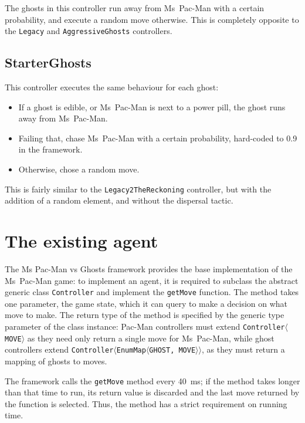 The ghosts in this controller run away from Ms~Pac-Man with a certain probability, and execute a random move otherwise.  This is completely opposite to the {\tt Legacy} and {\tt AggressiveGhosts} controllers.

\subsection{StarterGhosts}

This controller executes the same behaviour for each ghost:

\begin{itemize}
\item If a ghost is edible, or Ms~Pac-Man is next to a power pill, the ghost runs away from Ms~Pac-Man.
\item Failing that, chase Ms~Pac-Man with a certain probability, hard-coded to 0.9 in the framework.
\item Otherwise, chose a random move.
\end{itemize}

This is fairly similar to the {\tt Legacy2TheReckoning} controller, but with the addition of a random element, and without the dispersal tactic.

\section{The existing agent}
\label{sec:existingagent}

The Ms Pac-Man vs Ghosts framework provides the base implementation of the Ms~Pac-Man game: to implement an agent, it is required to subclass the abstract generic class {\tt Controller} and implement the {\tt getMove} function.  The method takes one parameter, the game state, which it can query to make a decision on what move to make.  The return type of the method is specified by the generic type parameter of the class instance:  Pac-Man controllers must extend {\tt Controller{$\langle$}MOVE{$\rangle$}} as they need only return a single move for Ms~Pac-Man, while ghost controllers extend {\tt Controller{$\langle$}EnumMap{$\langle$}GHOST, MOVE{$\rangle\rangle$}}, as they must return a mapping of ghosts to moves.

The framework calls the {\tt getMove} method every 40~ms; if the method takes longer than that time to run, its return value is discarded and the last move returned by the function is selected.  Thus, the method has a strict requirement on running time.

